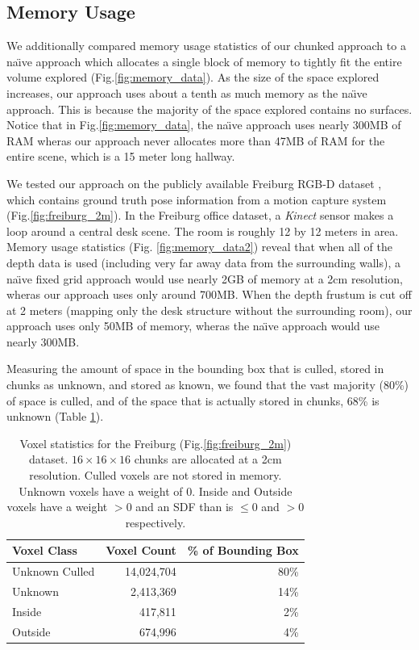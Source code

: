 \documentclass[10pt,twocolumn,letterpaper]{article}
\newcommand{\figref}[1]{Fig.\ref{#1}}
\begin{document}
\subsection{Memory Usage}
\label{section:memory}
We additionally compared memory usage statistics of our chunked approach to a
na\"{\i}ve approach which allocates a single block of memory to tightly fit the
entire volume explored (\figref{fig:memory_data}). As the size of the space
explored increases, our approach uses about a tenth as much memory as the
na\"{\i}ve approach. This is because the majority of the space explored contains no
surfaces. Notice that in \figref{fig:memory_data}, the na\"{\i}ve approach uses
nearly 300MB of RAM wheras our approach never allocates more than 47MB of RAM
for the entire scene, which is a 15 meter long hallway.

We tested our approach on the publicly available Freiburg RGB-D dataset
\cite{FREIBURG}, which contains ground truth pose information from a motion
capture system (\figref{fig:freiburg_2m}). In the Freiburg office dataset, a
\textit{Kinect} sensor makes a loop around a central desk scene. The room is
roughly 12 by 12 meters in area.  Memory usage statistics (Fig.
\ref{fig:memory_data2}) reveal that when all of the depth data is used
(including very far away data from the surrounding walls), a na\"{\i}ve fixed grid
approach would use nearly 2GB of memory at a 2cm resolution, wheras our
approach uses only around 700MB. When the depth frustum is cut off at 2 meters
(mapping only the desk structure without the surrounding room), our approach
uses only 50MB of memory, wheras the na\"{\i}ve approach would use nearly 300MB.

Measuring the amount of space in the bounding box that is culled, stored in
chunks as unknown, and stored as known, we found that the vast majority (80\%)
of space is culled, and of the space that is actually stored in chunks, 68\% is
unknown (Table \ref{table:volumecount}).

\begin{table}
\begin{tabular} {| l | r | r |}
\hline
Voxel Class & Voxel Count & \% of Bounding Box \\ \hline
Unknown Culled & 14,024,704 & 80\% \\ \hline
Unknown & 2,413,369 & 14\% \\ \hline
Inside & 417,811 & 2\% \\ \hline
Outside & 674,996 & 4\% \\ \hline
\end{tabular}
\caption{Voxel statistics for the Freiburg (\figref{fig:freiburg_2m}) dataset.
$16\times16\times16$ chunks are allocated at a 2cm resolution. Culled voxels are
not stored in memory. Unknown voxels have a weight of 0. Inside and Outside
voxels have a weight $> 0$ and an SDF than is $\leq 0$ and $> 0$ respectively. }
\label{table:volumecount}
\end{table} 
\end{document}
